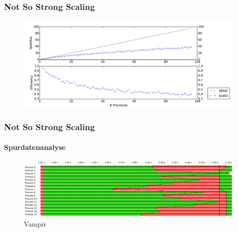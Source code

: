 \begin{frame}
    \frametitle{Not So Strong Scaling}

    \begin{figure}
        \centering
        \includegraphics[width=\textwidth]{content/img/strong_scaling_time_static}
    \end{figure}

\end{frame}

\begin{frame}
    \frametitle{Not So Strong Scaling}
    \framesubtitle{Spurdatenanalyse}

    \begin{figure}
        \centering
        \includegraphics[width=\textwidth]{content/img/vampir_static}
        \caption{Vampir}
    \end{figure}

\end{frame}


